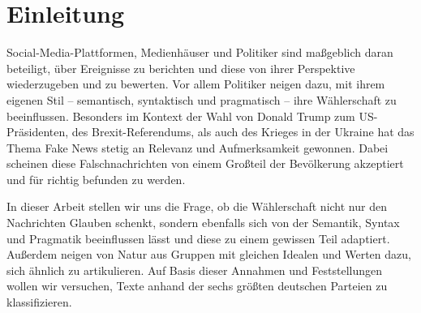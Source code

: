 
\chapter{Einleitung} \label{ch:introduction}


Social-Media-Plattformen, Medienhäuser und Politiker sind maßgeblich daran beteiligt, über Ereignisse zu berichten und diese von ihrer Perspektive wiederzugeben und zu bewerten. Vor allem Politiker neigen dazu, mit ihrem eigenen Stil -- semantisch, syntaktisch und pragmatisch -- ihre Wählerschaft zu beeinflussen. Besonders im Kontext der Wahl von Donald Trump zum US-Präsidenten, des Brexit-Referendums, als auch des Krieges in der Ukraine hat das Thema Fake News stetig an Relevanz und Aufmerksamkeit gewonnen. Dabei scheinen diese Falschnachrichten von einem Großteil der Bevölkerung akzeptiert und für richtig befunden zu werden.

In dieser Arbeit stellen wir uns die Frage, ob die Wählerschaft nicht nur den Nachrichten Glauben schenkt, sondern ebenfalls sich von der Semantik, Syntax und Pragmatik beeinflussen lässt und diese zu einem gewissen Teil adaptiert. Außerdem neigen von Natur aus Gruppen mit gleichen Idealen und Werten dazu, sich ähnlich zu artikulieren. Auf Basis dieser Annahmen und Feststellungen wollen wir versuchen, Texte anhand der sechs größten deutschen Parteien zu klassifizieren.




